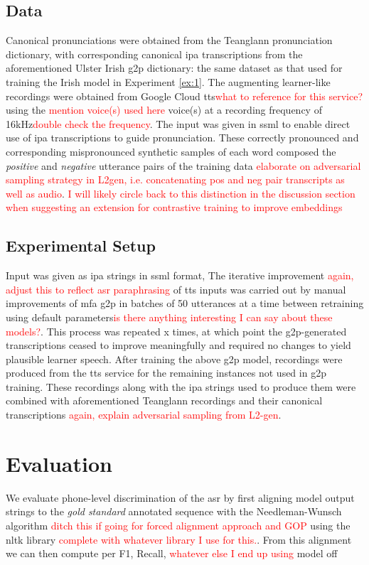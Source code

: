 \documentclass[thesis]{cluu}
\newcommand{\todo}[1]{\textcolor{red}{#1}}
\begin{document}
\subsection{Data} 
Canonical pronunciations were obtained from the Teanglann pronunciation dictionary, with corresponding canonical \gls{ipa} transcriptions from the aforementioned Ulster Irish \gls{g2p} dictionary: the same dataset as that used for training the Irish model in Experiment \ref{ex:1}. The augmenting learner-like recordings were obtained from Google Cloud \acrlong{tts}\todo{what to reference for this service?} using the \todo{mention voice(s) used here} voice(s) at a recording frequency of 16kHz\todo{double check the frequency}. The input was given in \gls{ssml} to enable direct use of \gls{ipa} transcriptions to guide pronunciation. These correctly pronounced and corresponding mispronounced synthetic samples of each word composed the \textit{positive} and \textit{negative} utterance pairs of the training data \todo{elaborate on adversarial sampling strategy in L2gen, i.e. concatenating pos and neg pair transcripts as well as audio}. \todo{I will likely circle back to this distinction in the discussion section when suggesting an extension for contrastive training to improve embeddings}

\subsection{Experimental Setup}
Input was given as \gls{ipa} strings in \gls{ssml} format, 
The iterative improvement \todo{again, adjust this to reflect asr paraphrasing} of \gls{tts} inputs was carried out by manual improvements of \gls{mfa} \gls{g2p} \parencite{mcauliffeMontrealForcedAligner2017} in batches of 50 utterances at a time between retraining using default parameters\todo{is there anything interesting I can say about these models?}. This process was repeated x times, at which point the \gls{g2p}-generated transcriptions ceased to improve meaningfully and required no changes to yield plausible learner speech.
After training the above \gls{g2p} model, recordings were produced from the \gls{tts} service for the remaining instances not used in \gls{g2p} training. These recordings along with the \gls{ipa} strings used to produce them were combined with aforementioned Teanglann recordings and their canonical transcriptions \todo{again, explain adversarial sampling from L2-gen}.

\section{Evaluation}
We evaluate phone-level discrimination of the \gls{asr} by first aligning model output strings to the \textit{gold standard} annotated sequence with the Needleman-Wunsch algorithm \parencite{needlemanGeneralMethodApplicable1970} \todo{ditch this if going for forced alignment approach and GOP} using the \gls{nltk} library \todo{complete with whatever library I use for this.}. From this alignment we can then compute \gls{per} F1, Recall, \todo{whatever else I end up using} 
model off \parencite{leungCNNRNNCTCBasedEndtoend2019}
\end{document}
